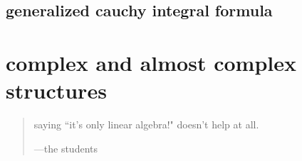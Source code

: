 \subsection{generalized cauchy integral formula}



\section{complex and almost complex structures}
\vspace{1em}
\begin{quotation}
saying ``it's only linear algebra!" doesn't help at all.

	\hfill ---the students
\end{quotation}
\vspace{2em}

